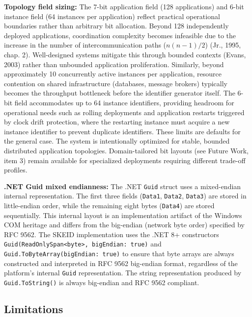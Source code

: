 \documentclass[fleqn,10pt,lineno]{wlpeerj}
\begin{document}
\textbf{Topology field sizing:} The 7-bit application field (128
applications) and 6-bit instance field (64 instances per application)
reflect practical operational boundaries rather than arbitrary bit
allocation. Beyond 128 independently deployed applications, coordination
complexity becomes infeasible due to the increase in the number of
intercommunication paths (\(n(n-1)/2\)) (Jr., 1995, chap. 2).
Well-designed systems mitigate this through bounded contexts (Evans,
2003) rather than unbounded application proliferation. Similarly, beyond
approximately 10 concurrently active instances per application, resource
contention on shared infrastructure (databases, message brokers)
typically becomes the throughput bottleneck before the identifier
generator itself. The 6-bit field accommodates up to 64 instance
identifiers, providing headroom for operational needs such as rolling
deployments and application restarts triggered by clock drift
protection, where the restarting instance must acquire a new instance
identifier to prevent duplicate identifiers. These limits are defaults
for the general case. The system is intentionally optimized for stable,
bounded distributed application topologies. Domain-tailored bit layouts
(see Future Work, item 3) remain available for specialized deployments
requiring different trade-off profiles.

\textbf{.NET Guid mixed endianness:} The .NET \texttt{Guid} struct uses
a mixed-endian internal representation. The first three fields
(\texttt{Data1}, \texttt{Data2}, \texttt{Data3}) are stored in
little-endian order, while the remaining eight bytes (\texttt{Data4})
are stored sequentially. This internal layout is an implementation
artifact of the Windows COM heritage and differs from the big-endian
(network byte order) specified by RFC 9562. The SKEID implementation
uses the .NET 8+ constructors
\texttt{Guid(ReadOnlySpan\textless{}byte\textgreater{},\ bigEndian:\ true)}
and \texttt{Guid.ToByteArray(bigEndian:\ true)} to ensure that byte
arrays are always constructed and interpreted in RFC 9562 big-endian
format, regardless of the platform's internal \texttt{Guid}
representation. The string representation produced by
\texttt{Guid.ToString()} is always big-endian and RFC 9562 compliant.

\subsection{Limitations}\label{limitations}
\end{document}
